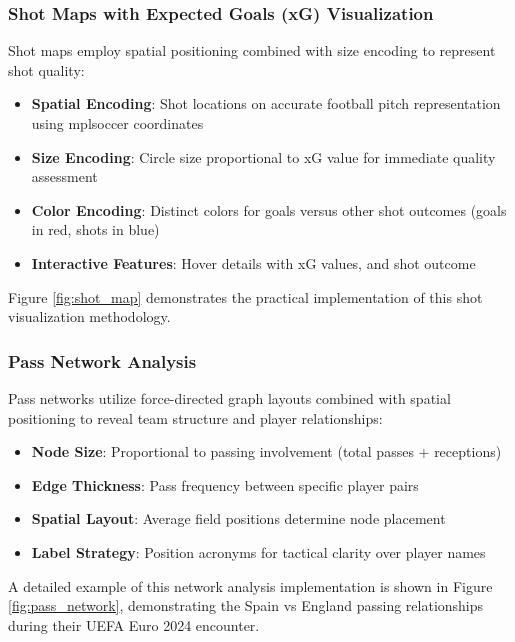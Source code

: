 \documentclass[12pt,a4paper]{article}
\begin{document}
\subsubsection{Shot Maps with Expected Goals (xG) Visualization}
\label{sec:shot_maps}
Shot maps employ spatial positioning combined with size encoding to represent shot quality:
\begin{itemize}
    \item \textbf{Spatial Encoding}: Shot locations on accurate football pitch representation using mplsoccer coordinates
    \item \textbf{Size Encoding}: Circle size proportional to xG value for immediate quality assessment
    \item \textbf{Color Encoding}: Distinct colors for goals versus other shot outcomes (goals in red, shots in blue)
    \item \textbf{Interactive Features}: Hover details with xG values, and shot outcome
\end{itemize}

Figure \ref{fig:shot_map} demonstrates the practical implementation of this shot visualization methodology.

\subsubsection{Pass Network Analysis}
\label{sec:pass_network}
Pass networks utilize force-directed graph layouts combined with spatial positioning to reveal team structure and player relationships:
\begin{itemize}
    \item \textbf{Node Size}: Proportional to passing involvement (total passes + receptions)
    \item \textbf{Edge Thickness}: Pass frequency between specific player pairs
    \item \textbf{Spatial Layout}: Average field positions determine node placement
    \item \textbf{Label Strategy}: Position acronyms for tactical clarity over player names
\end{itemize}

A detailed example of this network analysis implementation is shown in Figure \ref{fig:pass_network}, demonstrating the Spain vs England passing relationships during their UEFA Euro 2024 encounter.
\end{document}
